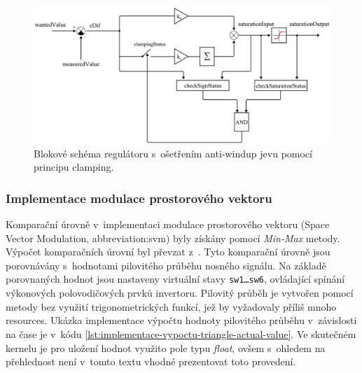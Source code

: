 \documentclass[a4paper, twoside, 11pt]{article}
\begin{document}
			\begin{figure}[htbp!]
				\centering
				\includegraphics[width=1\textwidth]{src/pdf/regulator-scheme.pdf}
			   \caption{Blokové schéma regulátoru s~ošetřením anti-windup jevu pomocí principu clamping.}
				\label{fig:regulator-scheme}
		  \end{figure}

		  \subsubsection{Implementace modulace prostorového vektoru}
		  	Komparační úrovně v~implementaci modulace prostorového vektoru (Space Vector Modulation, \gls{abbreviation:svm}) byly získány pomocí \textit{Min-Max} metody. Výpočet komparačních úrovní byl převzat z~\cite{microsemi-svm-min-max-algoritmus}. Tyto komparační úrovně jsou porovnávány s~hodnotami pilovitého průběhu nosného signálu. Na základě porovnaných hodnot jsou nastaveny virtuální stavy \texttt{sw1\dots sw6}, ovládající spínání výkonových polovodičových prvků invertoru. Pilovitý průběh je vytvořen pomocí metody bez využití trigonometrických funkcí, jež by vyžadovaly příliš mnoho resources. Ukázka implementace výpočtu hodnoty pilovitého průběhu v~závislosti na čase je v~kódu \ref{lst:implementace-vypoctu-triangle-actual-value}. Ve skutečném kernelu je pro uložení hodnot využito pole typu \textit{float}, ovšem s~ohledem na přehlednost není v~tomto textu vhodné prezentovat toto provedení.\par
			
\end{document}

